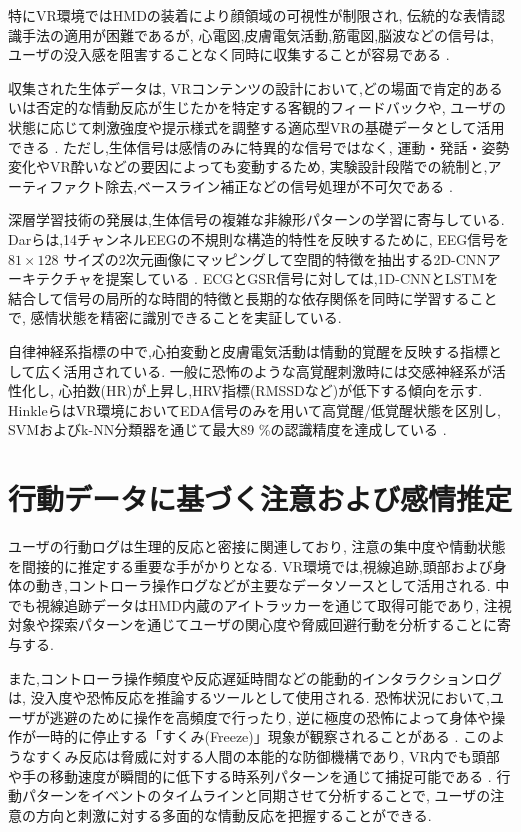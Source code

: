\documentclass[book,paper=a4,fontsize=10pt,jafontscale=0.92]{jlreq}
\begin{document}
特にVR環境ではHMDの装着により顔領域の可視性が制限され,
伝統的な表情認識手法の適用が困難であるが,
心電図,皮膚電気活動,筋電図,脳波などの信号は,
ユーザの没入感を阻害することなく同時に収集することが容易である \cite{MarinMorales2020, Liao2020DesignAE}.

収集された生体データは,
VRコンテンツの設計において,どの場面で肯定的あるいは否定的な情動反応が生じたかを特定する客観的フィードバックや,
ユーザの状態に応じて刺激強度や提示様式を調整する適応型VRの基礎データとして活用できる \cite{MarinMorales2020, OrozcoMora2024}.
ただし,生体信号は感情のみに特異的な信号ではなく,
運動・発話・姿勢変化やVR酔いなどの要因によっても変動するため,
実験設計段階での統制と,アーティファクト除去,ベースライン補正などの信号処理が不可欠である \cite{MarinMorales2020}.

深層学習技術の発展は,生体信号の複雑な非線形パターンの学習に寄与している.
Darらは,14チャンネルEEGの不規則な構造的特性を反映するために,
EEG信号を $81 \times 128$ サイズの2次元画像にマッピングして空間的特徴を抽出する2D-CNNアーキテクチャを提案している \cite{Dar2020}.
ECGとGSR信号に対しては,1D-CNNとLSTMを結合して信号の局所的な時間的特徴と長期的な依存関係を同時に学習することで,
感情状態を精密に識別できることを実証している.

自律神経系指標の中で,心拍変動と皮膚電気活動は情動的覚醒を反映する指標として広く活用されている.
一般に恐怖のような高覚醒刺激時には交感神経系が活性化し,
心拍数(HR)が上昇し,HRV指標(RMSSDなど)が低下する傾向を示す.
HinkleらはVR環境においてEDA信号のみを用いて高覚醒/低覚醒状態を区別し,
SVMおよびk-NN分類器を通じて最大89 \%の認識精度を達成している \cite{Hinkle2019}.

\section{行動データに基づく注意および感情推定}

ユーザの行動ログは生理的反応と密接に関連しており,
注意の集中度や情動状態を間接的に推定する重要な手がかりとなる.
VR環境では,視線追跡,頭部および身体の動き,コントローラ操作ログなどが主要なデータソースとして活用される.
中でも視線追跡データはHMD内蔵のアイトラッカーを通じて取得可能であり,
注視対象や探索パターンを通じてユーザの関心度や脅威回避行動を分析することに寄与する.

また,コントローラ操作頻度や反応遅延時間などの能動的インタラクションログは,
没入度や恐怖反応を推論するツールとして使用される.
恐怖状況において,ユーザが逃避のために操作を高頻度で行ったり,
逆に極度の恐怖によって身体や操作が一時的に停止する「すくみ(Freeze)」現象が観察されることがある \cite{Pajic2025}.
このようなすくみ反応は脅威に対する人間の本能的な防御機構であり,
VR内でも頭部や手の移動速度が瞬間的に低下する時系列パターンを通じて捕捉可能である \cite{Lin2017}.
行動パターンをイベントのタイムラインと同期させて分析することで,
ユーザの注意の方向と刺激に対する多面的な情動反応を把握することができる.
\end{document}
